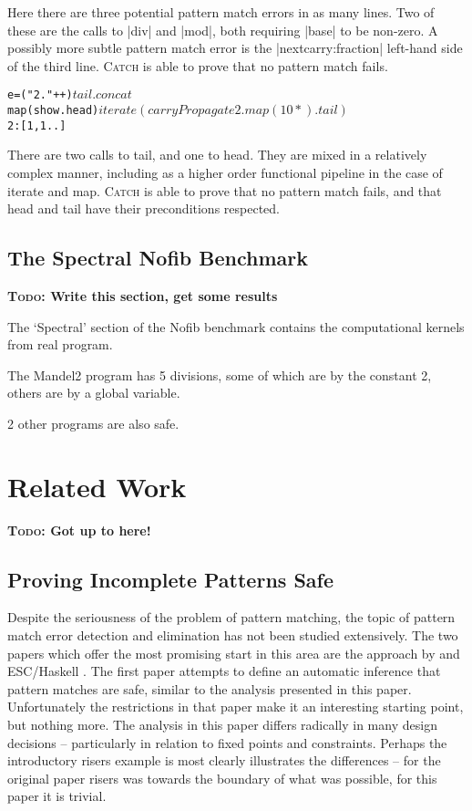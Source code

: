\documentclass[preprint]{sigplanconf}
\newcommand{\C}[1]{\textsf{#1}}
\newcommand{\catch}{\textsc{Catch}}
\newcommand{\todo}[1]{\textbf{\textsc{Todo:} #1}}
\newenvironment{code}{\begin{alltt}\small}{\end{alltt}}
\begin{document}
Here there are three potential pattern match errors in as many lines. Two of these are the calls to |div| and |mod|, both requiring |base| to be non-zero. A possibly more subtle pattern match error is the |nextcarry:fraction| left-hand side of the third line. \catch{} is able to prove that no pattern match fails.

\begin{code}
e =  ("2."++) $
     tail . concat $
     map (show.head) $
     iterate (carryPropagate 2 . map (10*) . tail) $
     2:[1,1..]
\end{code}

There are two calls to \C{tail}, and one to \C{head}. They are mixed in a relatively complex manner, including as a higher order functional pipeline in the case of \C{iterate} and \C{map}. \catch{} is able to prove that no pattern match fails, and that \C{head} and \C{tail} have their preconditions respected.

\subsection{The Spectral Nofib Benchmark}
\label{sec:spectral}

\todo{Write this section, get some results}

The `Spectral' section of the Nofib benchmark contains the computational kernels from real program.

The Mandel2 program has 5 divisions, some of which are by the constant 2, others are by a global variable.

2 other programs are also safe.

\section{Related Work}
\label{sec:related}

\todo{Got up to here!}

\subsection{Proving Incomplete Patterns Safe}

Despite the seriousness of the problem of pattern matching, the topic of pattern match error detection and elimination has not been studied extensively. The two papers which offer the most promising start in this area are the approach by \cite{me:catch_tfp} and ESC/Haskell \citep{esc_haskell}. The first paper attempts to define an automatic inference that pattern matches are safe, similar to the analysis presented in this paper. Unfortunately the restrictions in that paper make it an interesting starting point, but nothing more. The analysis in this paper differs radically in many design decisions -- particularly in relation to fixed points and constraints. Perhaps the introductory risers example is most clearly illustrates the differences -- for the original paper risers was towards the boundary of what was possible, for this paper it is trivial.
\end{document}
